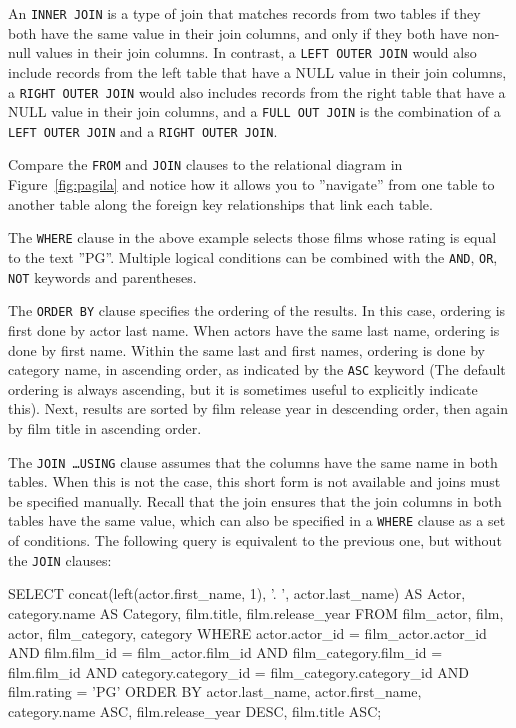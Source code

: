 An \texttt{INNER JOIN} is a type of join that matches records from two tables if they both have the same value in their join columns, and only if they both have non-null values in their join columns. In contrast, a \texttt{LEFT OUTER JOIN} would also include records from the left table that have a NULL value in their join columns, a \texttt{RIGHT OUTER JOIN} would also includes records from the right table that have a NULL value in their join columns, and a \texttt{FULL OUT JOIN} is the combination of a \texttt{LEFT OUTER JOIN} and a \texttt{RIGHT OUTER JOIN}.

Compare the \texttt{FROM} and \texttt{JOIN} clauses to the relational diagram in Figure~\ref{fig:pagila} and notice how it allows you to ''navigate'' from one table to another table along the foreign key relationships that link each table.

The \texttt{WHERE} clause in the above example selects those films whose rating is equal to the text ''PG''. Multiple logical conditions can be combined with the \texttt{AND}, \texttt{OR}, \texttt{NOT} keywords and parentheses.

The \texttt{ORDER BY} clause specifies the ordering of the results. In this case, ordering is first done by actor last name. When actors have the same last name, ordering is done by first name. Within the same last and first names, ordering is done by category name, in ascending order, as indicated by the \texttt{ASC} keyword (The default ordering is always ascending, but it is sometimes useful to explicitly indicate this). Next, results are sorted by film release year in descending order, then again by film title in ascending order.

The \texttt{JOIN \ldots USING} clause assumes that the columns have the same name in both tables. When this is not the case, this short form is not available and joins must be specified manually. Recall that the join ensures that the join columns in both tables have the same value, which can also be specified in a \texttt{WHERE} clause as a set of conditions. The following query is equivalent to the previous one, but without the \texttt{JOIN} clauses:

\begin{samepage}
\begin{sqlcode}
SELECT concat(left(actor.first_name, 1), '. ', 
           actor.last_name) AS Actor, 
       category.name AS Category, 
       film.title, 
       film.release_year
  FROM film_actor, film, actor, film_category, category
  WHERE actor.actor_id = film_actor.actor_id AND
        film.film_id = film_actor.film_id AND
        film_category.film_id = film.film_id AND
        category.category_id = film_category.category_id AND
        film.rating = 'PG'
  ORDER BY actor.last_name, 
           actor.first_name, 
           category.name ASC, 
           film.release_year DESC, 
           film.title ASC;
\end{sqlcode}
\end{samepage}


